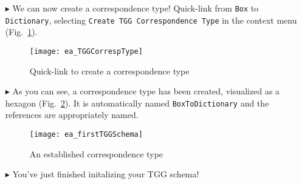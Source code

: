 \begin{itemize}
\vspace{0.5cm}

\item[$\blacktriangleright$] We can now create a correspondence type! Quick-link from \texttt{Box} to \texttt{Dictionary}, selecting \texttt{Create TGG
Corres\-pon\-dence Type} in the context menu (Fig.~\ref{ea:create_correspondence}).


\begin{figure}[htbp]
\begin{center}
  \texttt{[image: ea\_TGGCorrespType]}
  \caption{Quick-link to create a correspondence type} 
  \label{ea:create_correspondence}
\end{center}
\end{figure}

\item[$\blacktriangleright$] As you can see, a correspondence type has been created, visualized as a hexagon (Fig.~\ref{ea:firstCorrType}). It is automatically
named \texttt{BoxToDiction\-ary} and the references are appropriately named.

\vspace{0.5cm}

\begin{figure}[htbp]
\begin{center}
  \texttt{[image: ea\_firstTGGSchema]}
  \caption{An established correspondence type} 
  \label{ea:firstCorrType}
\end{center}
\end{figure}

\vspace{0.5cm}

\item[$\blacktriangleright$] You've just finished initalizing your TGG schema!



\end{itemize}

